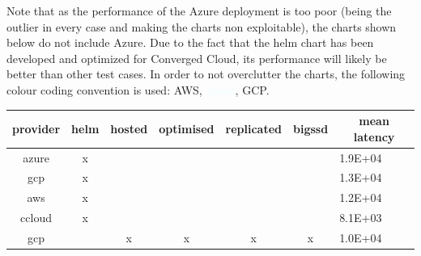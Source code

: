 \documentclass[11pt]{article}
\begin{document}
Note that as the performance of the Azure deployment is too poor (being the outlier in every case and making the charts non exploitable), the charts shown below do not include Azure. Due to the fact that the helm chart has been developed and optimized for Converged Cloud, its performance will likely be better than other test cases. In order to not overclutter the charts, the following colour coding convention is used: \textcolor{AWS}{AWS}, \textcolor{Azure}{Azure}, \textcolor{GCP}{GCP}. 

\begin{table}[!ht]
    \centering
    \begin{tabular}{|c|l|c|l|l|l|l|}
    \hline
    \textbf{provider} & \multicolumn{1}{c|}{\textbf{helm}} & \textbf{hosted}       & \multicolumn{1}{c|}{\textbf{optimised}} & \multicolumn{1}{c|}{\textbf{replicated}} & \multicolumn{1}{c|}{\textbf{bigssd}} & \multicolumn{1}{c|}{\textbf{mean latency}} \\ \hline
    azure             & \multicolumn{1}{c|}{x}             & \multicolumn{1}{l|}{} &                                         &                                          &                                      & 1.9E+04                                    \\ \hline
    gcp               & \multicolumn{1}{c|}{x}             & \multicolumn{1}{l|}{} &                                         &                                          &                                      & 1.3E+04                                    \\ \hline
    aws               & \multicolumn{1}{c|}{x}             & \multicolumn{1}{l|}{} &                                         &                                          &                                      & 1.2E+04                                    \\ \hline
    ccloud            & \multicolumn{1}{c|}{x}             & \multicolumn{1}{l|}{} &                                         &                                          &                                      & 8.1E+03                                    \\ \hline
    gcp               &                                    & x                     & \multicolumn{1}{c|}{x}                  & \multicolumn{1}{c|}{x}                   & \multicolumn{1}{c|}{x}               & 1.0E+04                                    \\ \hline

\end{tabular}
\end{table}
\end{document}
